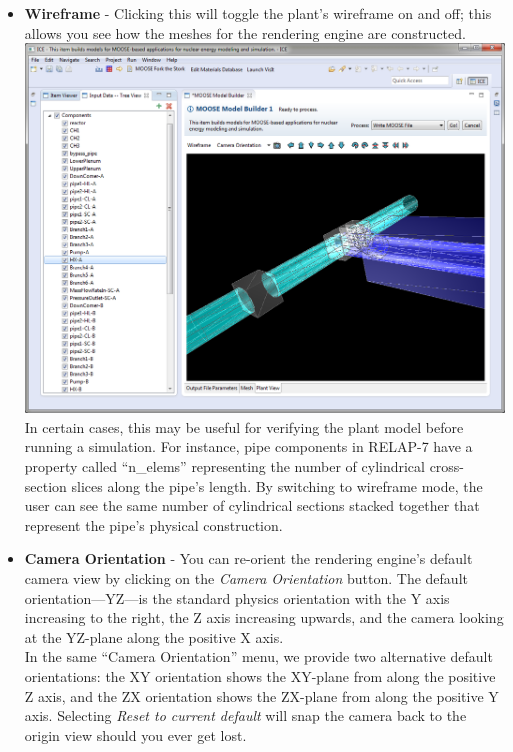 \begin{itemize}
\itemsep1pt\parskip0pt
\item
  \textbf{Wireframe} - Clicking this will toggle the plant's wireframe
  on and off; this allows you see how the meshes for the rendering
  engine are
  constructed.\\[2\baselineskip]\includegraphics[width=.90\textwidth]{figures/ICE_MOOSEPlantViewWireframe.png}\\[2\baselineskip]In
  certain cases, this may be useful for verifying the plant model before
  running a simulation. For instance, pipe components in RELAP-7 have a
  property called ``n\_elems'' representing the number of cylindrical
  cross-section slices along the pipe's length. By switching to
  wireframe mode, the user can see the same number of cylindrical
  sections stacked together that represent the pipe's physical
  construction.
\end{itemize}

\begin{itemize}
\itemsep1pt\parskip0pt
\item
  \textbf{Camera Orientation} - You can re-orient the rendering engine's
  default camera view by clicking on the \emph{Camera Orientation}
  button. The default orientation---YZ---is the standard \emph{} physics
  orientation with the Y axis increasing to the right, the Z axis
  increasing upwards, and the camera looking at the YZ-plane along the
  positive X axis.\\[2\baselineskip]In the same ``Camera Orientation''
  menu, we provide two alternative default orientations: the XY
  orientation shows the XY-plane from along the positive Z axis, and the
  ZX orientation shows the ZX-plane from along the positive Y axis.
  Selecting \emph{Reset to current default} will snap the camera back to
  the origin view should you ever get lost.
\end{itemize}

